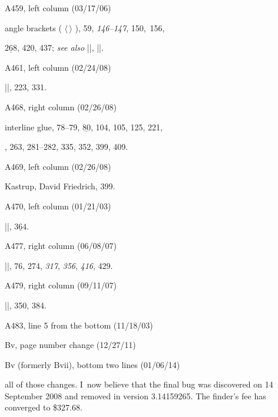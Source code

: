 {{\bugonpage A459, left column (03/17/06)

\eightpoint\noindent
angle brackets ( $\langle\,\rangle$ ), 59, {\it146--147}, 150,~156,\par
\noindent\qquad $\underline{268}$, 420, 437;
 {\sl see also\/} |\langle|, |\rangle|.

\bugonpage A461, left column (02/24/08)

\eightpoint\noindent
|\boxit|, 223, 331.

\bugonpage A468, right column (02/26/08)

\eightpoint\noindent
interline glue, 78--79, $\underline{80}$, 104, 105, 125, 221,\par
\noindent{}, 263, 281--282, 335, 352, 399, 409.

\bugonpage A469, left column (02/26/08)

\eightpoint\noindent
Kastrup, David Friedrich, 399.

\bugonpage A470, left column (01/21/03)

\eightpoint\noindent
|\loggingall|, $\underline{364}$.

\bugonpage A477, right column (06/08/07)

\eightpoint\noindent
\llap{*}|\spaceskip|, 76, 274, {\it317}, {\it356}, {\it416}, 429.

\bugonpage A479, right column (09/11/07)

\eightpoint\noindent
|\undefined|, 350, 384.

\bugonpage A483, line 5 from the bottom (11/18/03)

\eightpoint
{}

\def\\#1{\hbox{\it#1\/\kern.05em}} %
\def\to{\mathrel{.\,.}} %

\bugonpage Bv, page number change (12/27/11)

\eightpoint{}

\bugonpage Bv {(formerly Bvii)}, bottom two lines (01/06/14)

\eightpoint\noindent
all of those changes.
I~now believe that the final bug was discovered on 14 September 2008
and removed in version 3.14159265.
The finder's fee has converged to \$327.68.

}}
